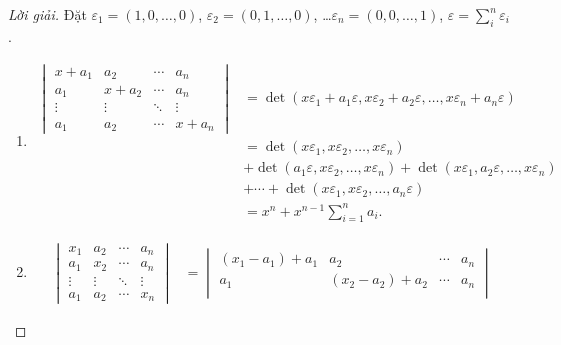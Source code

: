 \documentclass[class=linear-algebra,crop=false]{standalone}
\begin{document}
\begin{proof}[Lời giải]
	\par Đặt $\varepsilon_{1} = (1, 0, \ldots, 0)$, $\varepsilon_{2} = (0, 1, \ldots, 0)$, \ldots $\varepsilon_{n} = (0, 0, \ldots, 1)$, $\varepsilon = \displaystyle\sum^{n}_{i}\varepsilon_{i}$.
	\begin{enumerate}[label = (\alph*)]
		\item
		      \begin{align*}
			      \begin{vmatrix}
				      x + a_{1} & a_{2}     & \cdots & a_{n}     \\
				      a_{1}     & x + a_{2} & \cdots & a_{n}     \\
				      \vdots    & \vdots    & \ddots & \vdots    \\
				      a_{1}     & a_{2}     & \cdots & x + a_{n}
			      \end{vmatrix}
			       & = \det(x\varepsilon_{1} + a_{1}\varepsilon, x\varepsilon_{2} + a_{2}\varepsilon, \ldots, x\varepsilon_{n} + a_{n}\varepsilon)             \\
			       & = \det(x\varepsilon_{1}, x\varepsilon_{2}, \ldots, x\varepsilon_{n})                                                                      \\
			       & + \det(a_{1}\varepsilon, x\varepsilon_{2}, \ldots, x\varepsilon_{n}) + \det(x\varepsilon_{1}, a_{2}\varepsilon, \ldots, x\varepsilon_{n}) \\
			       & + \cdots + \det(x\varepsilon_{1}, x\varepsilon_{2}, \ldots, a_{n}\varepsilon)                                                             \\
			       & = x^{n} + x^{n-1}\sum^{n}_{i=1}a_{i}.
		      \end{align*}
		\item
		      \begin{align*}
			      \begin{vmatrix}
				      x_{1}  & a_{2}  & \cdots & a_{n}  \\
				      a_{1}  & x_{2}  & \cdots & a_{n}  \\
				      \vdots & \vdots & \ddots & \vdots \\
				      a_{1}  & a_{2}  & \cdots & x_{n}
			      \end{vmatrix}
			       & =
			      \begin{vmatrix}
				      (x_{1} - a_{1}) + a_{1} & a_{2}                   & \cdots & a_{n}                   \\
				      a_{1}                   & (x_{2} - a_{2}) + a_{2} & \cdots & a_{n}                   \\

\end{vmatrix}
\end{align*}
\end{enumerate}
\end{proof}
\end{document}
